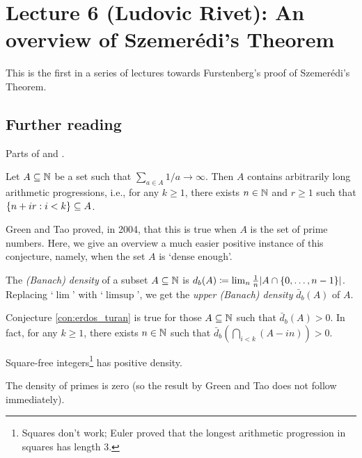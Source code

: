 \documentclass[reqno, twoside]{article}
\begin{document}
    \section{Lecture 6 (Ludovic Rivet): An overview of Szemerédi's Theorem}\label{sec:6}

    This is the first in a series of lectures towards Furstenberg's proof of Szemerédi's Theorem.

    {\vspace{-0.1in}\small\subsection*{Further reading}Parts of \cite[Lectures 16 and 17]{Tse22} and \cite[Lecture 10]{Tao08}.}

    \begin{conjecture}\label{con:erdos_turan}
        Let $A\subseteq\mathbb{N}$ be a set such that $\sum_{a\in A}1/a\to\infty$. Then $A$ contains arbitrarily long arithmetic progressions, i.e., for any $k\geq1$, there exists $n\in\mathbb{N}$ and $r\geq1$ such that $\left\{n+ir: i<k\right\}\subseteq A$.
    \end{conjecture}

    Green and Tao proved, in 2004, that this is true when $A$ is the set of prime numbers. Here, we give an overview a much easier positive instance of this conjecture, namely, when the set $A$ is `dense enough'.

    \begin{definition}
        The \textit{(Banach) density} of a subset $A\subseteq\mathbb{N}$ is $d_b(A)\coloneqq\lim_n\frac{1}{n}|A\cap\left\{0,\dots,n-1\right\}\!|$. Replacing `$\lim$' with `$\limsup$', we get the \textit{upper (Banach) density} $\bar{d}_b(A)$ of $A$.
    \end{definition}

    \begin{theorem}[Szemerédi; 1975]\label{thm:szemeredi}
        Conjecture \ref{con:erdos_turan} is true for those $A\subseteq\mathbb{N}$ such that $\bar{d}_b(A)>0$. In fact, for any $k\geq1$, there exists $n\in\mathbb{N}$ such that $\bar{d}_b(\bigcap_{i<k}(A-in))>0$.
    \end{theorem}

    \begin{exercise}
        Square-free integers\footnote{Squares don't work; Euler proved that the longest arithmetic progression in squares has length $3$.} has positive density.
    \end{exercise}

    \begin{exercise}
        The density of primes is zero (so the result by Green and Tao does not follow immediately).
    \end{exercise}
\end{document}
